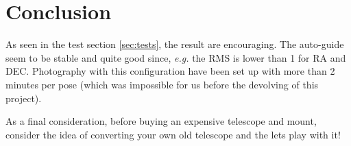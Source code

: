 
\section{Conclusion}
As seen in the test section \ref{sec:tests}, the result are encouraging.
The auto-guide seem to be stable and quite good since, \textit{e.g.} the RMS is lower than 1 for RA and DEC.
Photography with this configuration have been set up with more than 2 minutes per pose (which was impossible for us before the devolving of this project).

As a final consideration, before buying an expensive telescope and mount, consider the idea of converting your own old telescope and the lets play with it! 